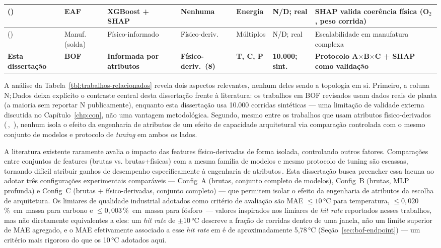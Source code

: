 \begin{table}[H]
{\begin{tabular}{|p{2.6cm}|p{1.1cm}|p{2.3cm}|p{1.5cm}|p{1.3cm}|p{1.7cm}|p{2.3cm}|}
\citeauthor{manojlovic2022eaf} (\citeyear{manojlovic2022eaf})\,\cite{manojlovic2022eaf} & EAF & XGBoost + SHAP & Nenhuma & Energia & N/D; real & SHAP valida coerência física (O$_2$, peso corrida) \\ \hline
\citeauthor{wang2025phoenix} (\citeyear{wang2025phoenix})\,\cite{wang2025phoenix} & Manuf. (solda) & Físico-informado & Físico-deriv. & Múltiplos & N/D; real & Escalabilidade em manufatura complexa \\ \hline
\textbf{Esta dissertação} & \textbf{BOF} & \textbf{Informada por atributos} & \textbf{Físico-deriv.\ (8)} & \textbf{T, C, P} & \textbf{10.000; sint.} & \textbf{Protocolo A$\times$B$\times$C + SHAP como validação} \\ \hline
\end{tabular}}
\end{table}

A análise da Tabela~\ref{tbl:trabalhos-relacionados} revela dois aspectos relevantes, nenhum deles sendo a topologia em si. Primeiro, a coluna N;\,Dados deixa explícito o contraste central desta dissertação frente à literatura: os trabalhos em BOF revisados usam dados reais de planta (a maioria sem reportar N publicamente), enquanto esta dissertação usa 10.000 corridas sintéticas — uma limitação de validade externa discutida no Capítulo~\ref{chp:con}, não uma vantagem metodológica. Segundo, mesmo entre os trabalhos que usam atributos físico-derivados (\citeauthor{bae2020bof}\,\cite{bae2020bof}, \citeauthor{wang2025phoenix}\,\cite{wang2025phoenix}), nenhum isola o efeito da engenharia de atributos de um efeito de capacidade arquitetural via comparação controlada com o mesmo conjunto de modelos e protocolo de \textit{tuning} em ambos os lados.

A literatura existente raramente avalia o impacto das features físico-derivadas de forma isolada, controlando outros fatores. Comparações entre conjuntos de features (brutas vs. brutas+físicas) com a mesma família de modelos e mesmo protocolo de tuning são escassas, tornando difícil atribuir ganhos de desempenho especificamente à engenharia de atributos\,\cite{zhou2024bof,chattopadhyay2022hybrid}. Esta dissertação busca preencher essa lacuna ao adotar três configurações experimentais comparáveis — Config~A (brutas, conjunto completo de modelos), Config~B (brutas, MLP profunda) e Config~C (brutas + físico-derivadas, conjunto completo) — que permitem isolar o efeito da engenharia de atributos da escolha de arquitetura. Os limiares de qualidade industrial adotados como critério de avaliação são MAE $\leq 10$\,°C para temperatura, $\leq 0{,}020$\,\%~em~massa para carbono e $\leq 0{,}003$\,\%~em~massa para fósforo\,\cite{zhou2024bof,bae2020bof} — valores inspirados nos limiares de \textit{hit rate} reportados nesses trabalhos, mas não diretamente equivalentes a eles: um \textit{hit rate} de $\pm10$\,°C descreve a fração de corridas dentro de uma janela, não um limite superior de MAE agregado, e o MAE efetivamente associado a esse \textit{hit rate} em \citeauthor{zhou2024bof} é de aproximadamente 5,78\,°C (Seção~\ref{sec:bof-endpoint}) — um critério mais rigoroso do que os 10\,°C adotados aqui.


